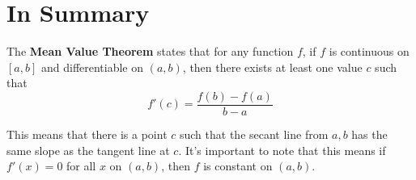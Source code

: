 \documentclass{ximera}
\begin{document}
\section{In Summary}
\begin{definition}
The \textbf{Mean Value Theorem} states that for any function $f$, if $f$ is continuous on $[a,b]$ and differentiable on $(a,b)$, then there exists at least one value $c$ such that $$f'(c)=\frac{f(b)-f(a)}{b-a}$$

This means that there is a point $c$ such that the secant line from $a, b$ has the same slope as the tangent line at $c$. It's important to note that this means if $f'(x)=0$ for all $x$ on $(a,b)$, then $f$ is constant on $(a,b)$.
\end{definition}
\end{document}
